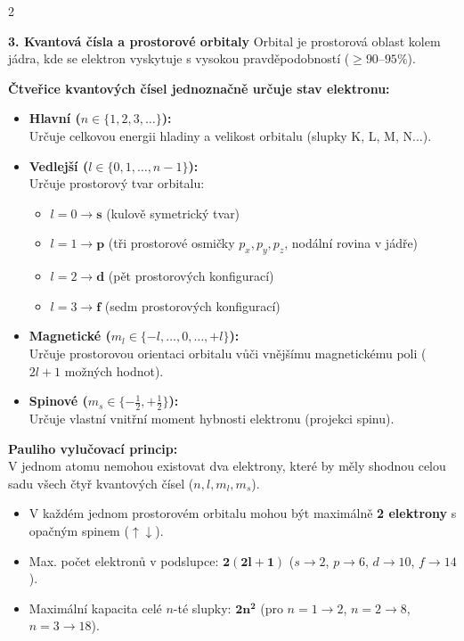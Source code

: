 \documentclass[9pt,a4paper]{article}
\begin{document}
\begin{tcolorbox}[secbox,title=5. KVANTOVÁ MECHANIKA, HEISENBERGOVY RELACE NEURČITOSTI A ATOMOVÉ ORBITALY]
\begin{multicols}{2}
\columnbreak

\textbf{\large 3. Kvantová čísla a prostorové orbitaly}
Orbital je prostorová oblast kolem jádra, kde se elektron vyskytuje s vysokou pravděpodobností ($\ge 90$--$95\%$).

\textbf{Čtveřice kvantových čísel jednoznačně určuje stav elektronu:}
\begin{itemize}
  \item \textbf{Hlavní ($n \in \{1, 2, 3, \dots\}$):}\\
  Určuje celkovou energii hladiny a velikost orbitalu (slupky K, L, M, N...).
  \item \textbf{Vedlejší ($l \in \{0, 1, \dots, n-1\}$):}\\
  Určuje prostorový tvar orbitalu:
  \begin{itemize}
    \item $l = 0 \to \mathbf{s}$ (kulově symetrický tvar)
    \item $l = 1 \to \mathbf{p}$ (tři prostorové osmičky $p_x, p_y, p_z$, nodální rovina v jádře)
    \item $l = 2 \to \mathbf{d}$ (pět prostorových konfigurací)
    \item $l = 3 \to \mathbf{f}$ (sedm prostorových konfigurací)
  \end{itemize}
  \item \textbf{Magnetické ($m_l \in \{-l, \dots, 0, \dots, +l\}$):}\\
  Určuje prostorovou orientaci orbitalu vůči vnějšímu magnetickému poli ($2l+1$ možných hodnot).
  \item \textbf{Spinové ($m_s \in \{-\frac{1}{2}, +\frac{1}{2}\}$):}\\
  Určuje vlastní vnitřní moment hybnosti elektronu (projekci spinu).
\end{itemize}

\vspace{2mm}

\begin{tcolorbox}[alertbox]
\textbf{Pauliho vylučovací princip:}\\
V jednom atomu nemohou existovat dva elektrony, které by měly shodnou celou sadu všech čtyř kvantových čísel ($n, l, m_l, m_s$).
\begin{itemize}
  \item V každém jednom prostorovém orbitalu mohou být maximálně \textbf{2 elektrony} s opačným spinem ($\uparrow\downarrow$).
  \item Max. počet elektronů v podslupce: $\mathbf{2(2l+1)}$ ($s \to 2$, $p \to 6$, $d \to 10$, $f \to 14$).
  \item Maximální kapacita celé $n$-té slupky: $\mathbf{2n^2}$ (pro $n=1 \to 2$, $n=2 \to 8$, $n=3 \to 18$).
\end{itemize}
\end{tcolorbox}

\end{multicols}
\end{tcolorbox}
\end{document}
